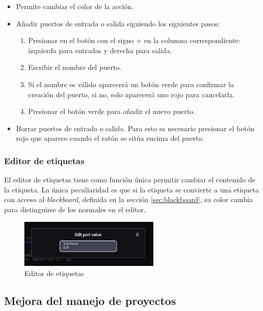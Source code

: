 \begin{itemize}
    \item Permite cambiar el color de la acción.
    \item Añadir puertos de entrada o salida siguiendo los siguientes pasos:
    \begin{enumerate}
        \item Presionar en el botón con el signo + en la columna correspondiente: izquierda para entradas y derecha para salida.
        \item Escribir el nombre del puerto.
        \item Si el nombre es válido aparecerá un botón verde para confirmar la creación del puerto, si no, solo aparecerá uno rojo para cancelarla.
        \item Presionar el botón verde para añadir el nuevo puerto.
    \end{enumerate}
    \item Borrar puertos de entrada o salida. Para esto es necesario presionar el botón rojo que aparece cuando el ratón se sitúa encima del puerto.
\end{itemize}

\subsubsection{Editor de etiquetas}

El editor de etiquetas tiene como función única permitir cambiar el contenido de la etiqueta. La única peculiaridad es que si la etiqueta se convierte a una etiqueta con acceso al \textit{blackboard}, definida en la sección \ref{sec:blackboard}, su color cambia para distinguirse de los normales en el editor.

\begin{figure}[H]
    \centering
    \includegraphics[width=0.6\textwidth]{figures/bt-avances/tag-edit.png}
    \caption{Editor de etiquetas}
    \label{fig:bt-tag}
\end{figure}

\subsection{Mejora del manejo de proyectos}

